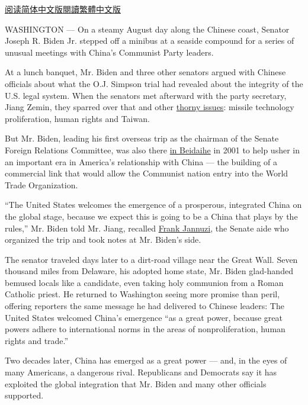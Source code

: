 \href{https://cn.nytimes3xbfgragh.onion/usa/20200908/biden-china/}{阅读简体中文版}\href{https://cn.nytimes3xbfgragh.onion/usa/20200908/biden-china/zh-hant/}{閱讀繁體中文版}

WASHINGTON --- On a steamy August day along the Chinese coast, Senator
Joseph R. Biden Jr. stepped off a minibus at a seaside compound for a
series of unusual meetings with China's Communist Party leaders.

At a lunch banquet, Mr. Biden and three other senators argued with
Chinese officials about what the O.J. Simpson trial had revealed about
the integrity of the U.S. legal system. When the senators met afterward
with the party secretary, Jiang Zemin, they sparred over that and other
\href{https://www.csmonitor.com/2001/0810/p6s1-wosc.html}{thorny
issues}: missile technology proliferation, human rights and Taiwan.

But Mr. Biden, leading his first overseas trip as the chairman of the
Senate Foreign Relations Committee, was also there
\href{https://www.nytimes3xbfgragh.onion/2012/07/22/world/asia/chinas-communist-elders-take-backroom-intrigue-beachside.html}{in
Beidaihe} in 2001 to help usher in an important era in America's
relationship with China --- the building of a commercial link that would
allow the Communist nation entry into the World Trade Organization.

``The United States welcomes the emergence of a prosperous, integrated
China on the global stage, because we expect this is going to be a China
that plays by the rules,'' Mr. Biden told Mr. Jiang, recalled
\href{https://mansfieldfdn.org/about/mansfield-foundation-board/frank-jannuzi/}{Frank
Jannuzi}, the Senate aide who organized the trip and took notes at Mr.
Biden's side.

The senator traveled days later to a dirt-road village near the Great
Wall. Seven thousand miles from Delaware, his adopted home state, Mr.
Biden glad-handed bemused locals like a candidate, even taking holy
communion from a Roman Catholic priest. He returned to Washington seeing
more promise than peril, offering reporters the same message he had
delivered to Chinese leaders: The United States welcomed China's
emergence ``as a great power, because great powers adhere to
international norms in the areas of nonproliferation, human rights and
trade.''

Two decades later, China has emerged as a great power --- and, in the
eyes of many Americans, a dangerous rival. Republicans and Democrats say
it has exploited the global integration that Mr. Biden and many other
officials supported.

